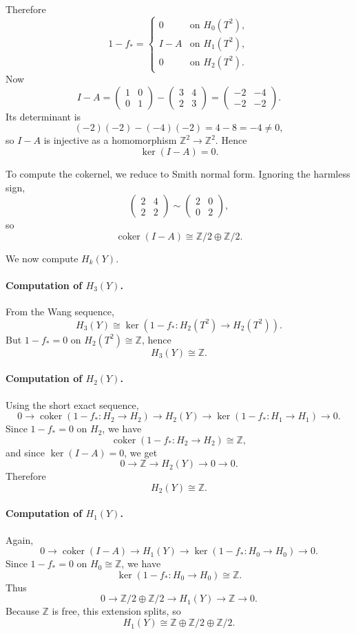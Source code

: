 \documentclass[12pt,a4paper]{article}
\theoremstyle{notespace}
\begin{document}
Therefore
\[
1-f_*=
\begin{cases}
	0 & \text{on }H_0(T^2),\\[1ex]
	I-A & \text{on }H_1(T^2),\\[1ex]
	0 & \text{on }H_2(T^2).
\end{cases}
\]
Now
\[
I-A=
\begin{pmatrix}
	1&0\\
	0&1
\end{pmatrix}
-
\begin{pmatrix}
	3&4\\
	2&3
\end{pmatrix}
=
\begin{pmatrix}
	-2&-4\\
	-2&-2
\end{pmatrix}.
\]
Its determinant is
\[
(-2)(-2)-(-4)(-2)=4-8=-4\neq 0,
\]
so \(I-A\) is injective as a homomorphism \(\mathbb Z^2\to \mathbb Z^2\). Hence
\[
\ker(I-A)=0.
\]

To compute the cokernel, we reduce to Smith normal form. Ignoring the harmless sign,
\[
\begin{pmatrix}
	2&4\\
	2&2
\end{pmatrix}
\sim
\begin{pmatrix}
	2&0\\
	0&2
\end{pmatrix},
\]
so
\[
\operatorname{coker}(I-A)\cong \mathbb Z/2\oplus \mathbb Z/2.
\]

We now compute \(H_k(Y)\).

\paragraph{Computation of \(H_3(Y)\).}
From the Wang sequence,
\[
H_3(Y)\cong \ker(1-f_*:H_2(T^2)\to H_2(T^2)).
\]
But \(1-f_*=0\) on \(H_2(T^2)\cong \mathbb Z\), hence
\[
H_3(Y)\cong \mathbb Z.
\]

\paragraph{Computation of \(H_2(Y)\).}
Using the short exact sequence,
\[
0\to \operatorname{coker}(1-f_*:H_2\to H_2)\to H_2(Y)\to \ker(1-f_*:H_1\to H_1)\to 0.
\]
Since \(1-f_*=0\) on \(H_2\), we have
\[
\operatorname{coker}(1-f_*:H_2\to H_2)\cong \mathbb Z,
\]
and since \(\ker(I-A)=0\), we get
\[
0\to \mathbb Z\to H_2(Y)\to 0\to 0.
\]
Therefore
\[
H_2(Y)\cong \mathbb Z.
\]

\paragraph{Computation of \(H_1(Y)\).}
Again,
\[
0\to \operatorname{coker}(I-A)\to H_1(Y)\to \ker(1-f_*:H_0\to H_0)\to 0.
\]
Since \(1-f_*=0\) on \(H_0\cong \mathbb Z\), we have
\[
\ker(1-f_*:H_0\to H_0)\cong \mathbb Z.
\]
Thus
\[
0\to \mathbb Z/2\oplus \mathbb Z/2\to H_1(Y)\to \mathbb Z\to 0.
\]
Because \(\mathbb Z\) is free, this extension splits, so
\[
H_1(Y)\cong \mathbb Z\oplus \mathbb Z/2\oplus \mathbb Z/2.
\]
\end{document}
